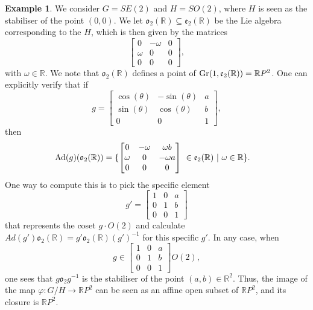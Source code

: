 \documentclass{article}
\theoremstyle{definition}
\newtheorem{example}[theorem]{Example}
\theoremstyle{remark}
\begin{document}
\begin{example}
We consider $G=SE(2)$ and $H=SO(2)$, where $H$ is seen as the stabiliser of the point $(0,0)$. We let $\mathfrak{o}_2(\mathbb{R})\subseteq \mathfrak{e}_2(\mathbb{R})$ be the Lie algebra corresponding to the $H$, which is then given by the matrices
\begin{equation*}
    \begin{bmatrix}   0 & -\omega & 0\\
        \omega & 0 & 0\\
        0 & 0 & 0
    \end{bmatrix},
\end{equation*}
with $\omega\in \mathbb{R}$. We note that $\mathfrak{o}_{2}(\mathbb{R})$ defines a point of $\textup{Gr}(1,\mathfrak{e}_2(\mathbb{R})) = \mathbb{R}P^{2}$. One can explicitly verify that if $$g=
        \begin{bmatrix}
        \cos(\theta) & - \sin(\theta) & a\\
        \sin(\theta) & \cos(\theta) &b\\
        0 & 0 & 1
    \end{bmatrix},
$$
then
\begin{align*}
    \textup{Ad}(g)(\mathfrak{o}_2(\mathbb{R})) &=
\{ \begin{bmatrix}
        0 & -\omega & \omega b \\
        \omega & 0 & -\omega a \\
        0 & 0 & 0
    \end{bmatrix}~ \in \mathfrak{e}_{2}(\mathbb{R})~ \vert~ \omega \in \mathbb{R}\}.
\end{align*}
One way to compute this is to pick the specific element $$g'= \begin{bmatrix}
    1 & 0 & a\\
    0& 1  & b\\
 0 & 0 & 1
\end{bmatrix}$$
that represents the coset $g\cdot O(2)$ and calculate $Ad(g')\mathfrak{o}_2(\mathbb{R}) = g'\mathfrak{o}_2(\mathbb{R})(g')^{-1}$ for this specific $g'$.
In any case, when $$g\in \begin{bmatrix}
    1 & 0 & a\\
    0& 1  & b\\
 0 & 0 & 1
\end{bmatrix}O(2),$$ one sees that $g\mathfrak{o}_{2}g^{-1}$ is the stabiliser of the point $(a,b) \in \mathbb{R}^2$. Thus, the image of the map $\varphi: G/H\rightarrow \mathbb{R}P^2$ can be seen as an affine open subset of $\mathbb{R}P^2$, and its closure is $\mathbb{R}P^2$. 
\end{example}
\end{document}

